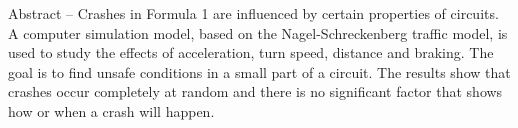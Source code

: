 Abstract -- Crashes in Formula 1 are influenced by certain properties of circuits. A computer simulation model, based on the Nagel-Schreckenberg traffic model, is used to study the effects of acceleration, turn speed, distance and braking. The goal is to find unsafe conditions in a small part of a circuit. The results show that crashes occur completely at random and there is no significant factor that shows how or when a crash will happen.
